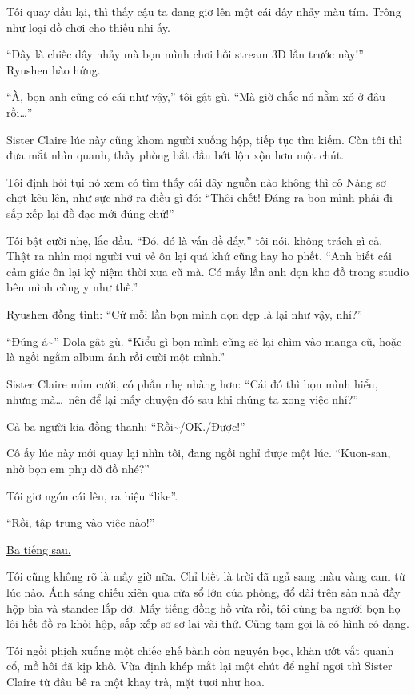 \documentclass[../main.tex]{subfiles}
\begin{document}
Tôi quay đầu lại, thì thấy cậu ta đang giơ lên một cái dây nhảy màu tím. Trông như loại đồ chơi cho thiếu nhi ấy.


``Đây là chiếc dây nhảy mà bọn mình chơi hồi stream 3D lần trước này!'' Ryushen hào hứng.

``À, bọn anh cũng có cái như vậy,'' tôi gật gù. ``Mà giờ chắc nó nằm xó ở đâu rồi\dots''

Sister Claire lúc này cũng khom người xuống hộp, tiếp tục tìm kiếm. Còn tôi thì đưa mắt nhìn quanh, thấy phòng bắt đầu bớt lộn xộn hơn một chút.

Tôi định hỏi tụi nó xem có tìm thấy cái dây nguồn nào không thì cô Nàng sơ chợt kêu lên, như sực nhớ ra điều gì đó: ``Thôi chết! Đáng ra bọn mình phải đi sắp xếp lại đồ đạc mới đúng chứ!''

Tôi bật cười nhẹ, lắc đầu. ``Đó, đó là vấn đề đấy,'' tôi nói, không trách gì cả. Thật ra nhìn mọi người vui vẻ ôn lại quá khứ cũng hay ho phết. ``Anh biết cái cảm giác ôn lại kỷ niệm thời xưa cũ mà. Có mấy lần anh dọn kho đồ trong studio bên mình cũng y như thế.''

Ryushen đồng tình: ``Cứ mỗi lần bọn mình dọn dẹp là lại như vậy, nhỉ?''

``Đúng á\~{}'' Dola gật gù. ``Kiểu gì bọn mình cũng sẽ lại chìm vào manga cũ, hoặc là ngồi ngắm album ảnh rồi cười một mình.''

Sister Claire mỉm cười, có phần nhẹ nhàng hơn: ``Cái đó thì bọn mình hiểu, nhưng mà\dots\ nên để lại mấy chuyện đó sau khi chúng ta xong việc nhỉ?''

Cả ba người kia đồng thanh: ``Rồi\~{}/OK./Được!''

Cô ấy lúc này mới quay lại nhìn tôi, đang ngồi nghỉ được một lúc. ``Kuon-san, nhờ bọn em phụ dỡ đồ nhé?''

Tôi giơ ngón cái lên, ra hiệu ``like''.

``Rồi, tập trung vào việc nào!''

\begin{center}
  \uline{Ba tiếng sau.}
\end{center}

Tôi cũng không rõ là mấy giờ nữa. Chỉ biết là trời đã ngả sang màu vàng cam từ lúc nào. Ánh sáng chiếu xiên qua cửa sổ lớn của phòng, đổ dài trên sàn nhà đầy hộp bìa và standee lắp dở. Mấy tiếng đồng hồ vừa rồi, tôi cùng ba người bọn họ lôi hết đồ ra khỏi hộp, sắp xếp sơ sơ lại vài thứ. Cũng tạm gọi là có hình có dạng.

Tôi ngồi phịch xuống một chiếc ghế bành còn nguyên bọc, khăn ướt vắt quanh cổ, mồ hôi đã kịp khô. Vừa định khép mắt lại một chút để nghỉ ngơi thì Sister Claire từ đâu bê ra một khay trà, mặt tươi như hoa.
\end{document}
